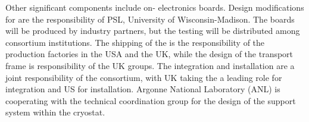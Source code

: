 Other significant components include on- electronics boards. Design modifications for  are the responsibility of PSL, University of Wisconsin-Madison. The boards will be produced by industry partners, but the testing will be distributed among consortium institutions. The shipping of the  is the responsibility of the production factories in the USA and the UK, while the design of the  transport frame is responsibility of the UK groups. The integration and installation are a joint responsibility of the consortium, with UK taking the a leading role for integration and US for installation. Argonne National Laboratory (ANL) is cooperating with the technical coordination group for the design of the  support system within the cryostat.
